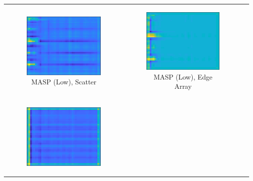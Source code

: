 {\begin{table}[tb]
\begin{tabular}{ccc}
		\begin{subfigure}{0.3\textwidth}\centering\includegraphics[width=0.8\columnwidth]{./dasp_algorithm_results/dasp_cnn_single_dream_fc_10.eps}
		\caption{MASP (Low), Scatter}\label{fig:cnnfc10}
		\end{subfigure}&
		\begin{subfigure}{0.3\textwidth}\centering\includegraphics[width=0.8\columnwidth]{./dasp_algorithm_results/dasp_cnn_single_dream_fc_11.eps}
		\caption{MASP (Low), Edge Array}\label{fig:cnnfc11}
		\end{subfigure}    \\
		\begin{subfigure}{0.3\textwidth}\centering\includegraphics[width=0.8\columnwidth]{./dasp_algorithm_results/dasp_cnn_single_dream_fc_13.eps}

\end{subfigure}
\end{tabular}
\end{table}}
